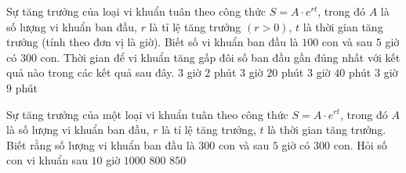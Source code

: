 \begin{ex} %
	Sự tăng trưởng của loại vi khuẩn tuân theo công thức $S={A \cdot {e^{rt}}}$, trong đó $A$ là số lượng vi khuẩn ban đầu, $ r$ là tỉ lệ tăng trưởng $( r>0 )$, $ t$ là thời gian tăng trưởng (tính theo đơn vị là giờ). Biết số vi khuẩn ban đầu là $100$ con và sau $5$ giờ có $300$ con. Thời gian để vi khuẩn tăng gấp đôi số ban đầu gần đúng nhất với kết quả nào trong các kết quả sau đây.
	\choice 
	{ $3$ giờ $2$ phút}
	{ $3$ giờ $20$ phút}
	{ $3$ giờ $40$ phút}
	{\True $3$ giờ $9$ phút}
\end{ex}

\begin{ex} %
	Sự tăng trưởng của một loại vi khuẩn tuân theo công thức $S=A\cdot{e^{rt}}$, trong đó $A$ là số lượng vi khuẩn ban đầu, $ r$ là tỉ lệ tăng trưởng, $t$ là thời gian tăng trưởng. Biết rằng số lượng vi khuẩn ban đầu là $300$ con và sau $5$ giờ có $300$ con. Hỏi số con vi khuẩn sau $10$ giờ
	 { $1000$} { $800$} { $850$}
\end{ex}

